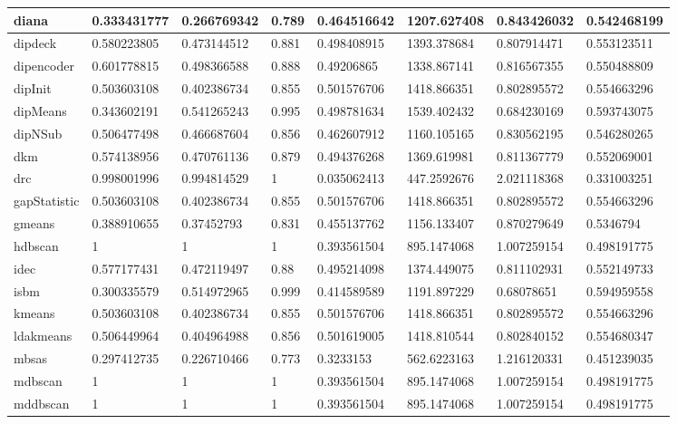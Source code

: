\begin{table}[H]
\begin{tabular}{|l|l|l|l|l|l|l|l|}
\hline
diana & 0.333431777 & 0.266769342 & 0.789 & 0.464516642 & 1207.627408 & 0.843426032 & 0.542468199 \\
\hline
dipdeck & 0.580223805 & 0.473144512 & 0.881 & 0.498408915 & 1393.378684 & 0.807914471 & 0.553123511 \\
\hline
dipencoder & 0.601778815 & 0.498366588 & 0.888 & 0.49206865 & 1338.867141 & 0.816567355 & 0.550488809 \\
\hline
dipInit & 0.503603108 & 0.402386734 & 0.855 & 0.501576706 & 1418.866351 & 0.802895572 & 0.554663296 \\
\hline
dipMeans & 0.343602191 & 0.541265243 & 0.995 & 0.498781634 & 1539.402432 & 0.684230169 & 0.593743075 \\
\hline
dipNSub & 0.506477498 & 0.466687604 & 0.856 & 0.462607912 & 1160.105165 & 0.830562195 & 0.546280265 \\
\hline
dkm & 0.574138956 & 0.470761136 & 0.879 & 0.494376268 & 1369.619981 & 0.811367779 & 0.552069001 \\
\hline
drc & 0.998001996 & 0.994814529 & 1 & 0.035062413 & 447.2592676 & 2.021118368 & 0.331003251 \\
\hline
gapStatistic & 0.503603108 & 0.402386734 & 0.855 & 0.501576706 & 1418.866351 & 0.802895572 & 0.554663296 \\
\hline
gmeans & 0.388910655 & 0.37452793 & 0.831 & 0.455137762 & 1156.133407 & 0.870279649 & 0.5346794 \\
\hline
hdbscan & 1 & 1 & 1 & 0.393561504 & 895.1474068 & 1.007259154 & 0.498191775 \\
\hline
idec & 0.577177431 & 0.472119497 & 0.88 & 0.495214098 & 1374.449075 & 0.811102931 & 0.552149733 \\
\hline
isbm & 0.300335579 & 0.514972965 & 0.999 & 0.414589589 & 1191.897229 & 0.68078651 & 0.594959558 \\
\hline
kmeans & 0.503603108 & 0.402386734 & 0.855 & 0.501576706 & 1418.866351 & 0.802895572 & 0.554663296 \\
\hline
ldakmeans & 0.506449964 & 0.404964988 & 0.856 & 0.501619005 & 1418.810544 & 0.802840152 & 0.554680347 \\
\hline
mbsas & 0.297412735 & 0.226710466 & 0.773 & 0.3233153 & 562.6223163 & 1.216120331 & 0.451239035 \\
\hline
mdbscan & 1 & 1 & 1 & 0.393561504 & 895.1474068 & 1.007259154 & 0.498191775 \\
\hline
mddbscan & 1 & 1 & 1 & 0.393561504 & 895.1474068 & 1.007259154 & 0.498191775 \\

\end{tabular}
\end{table}
